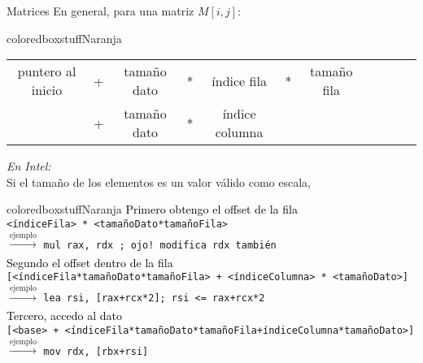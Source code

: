 \documentclass[aspectratio=169]{beamer}
\begin{document}
\begin{frame}[fragile]{Matrices} 
    En general, para una matriz $M[i,j]$:\\
    \bigskip
    \begin{beamercolorbox}[wd=1\textwidth,sep=0.5em]{coloredboxstuffNaranja}
    \begin{center}
    \small
    \vspace{-0.5cm}
    \begin{tabular}{clclclclclc}
    puntero al inicio & + & tamaño dato & * & índice fila    & * & tamaño fila\\
                      & + & tamaño dato & * & índice columna &   & \\
    \end{tabular}
    \end{center}
    \vspace{-0.5cm}
    \end{beamercolorbox}
    \vskip 5pt
    \pause
    \textit{En Intel:}\\
    \vskip 3pt
    Si el tamaño de los elementos es un valor válido como escala,
    \vskip 3pt
    \begin{beamercolorbox}[wd=1\textwidth,sep=0.5em]{coloredboxstuffNaranja}
    \small
    \pause
    \textcolor{black}{Primero obtengo el offset de la fila}\\
    \verb|<índiceFila> * <tamañoDato*tamañoFila>|\\
    $\xrightarrow[]{\text{ejemplo}}$ \verb|mul rax, rdx ; ojo! modifica rdx también|\\
    \vskip 5pt
    \pause
    \textcolor{black}{Segundo el offset dentro de la fila}\\
    \verb|[<índiceFila*tamañoDato*tamañoFila> + <índiceColumna> * <tamañoDato>]|\\
    $\xrightarrow[]{\text{ejemplo}}$ \verb|lea rsi, [rax+rcx*2]; rsi <= rax+rcx*2| \\
    \vskip 5pt
    \pause
    \textcolor{black}{Tercero, accedo al dato}\\
    \verb|[<base> + <índiceFila*tamañoDato*tamañoFila+índiceColumna*tamañoDato>]|\\
    $\xrightarrow[]{\text{ejemplo}}$ \verb|mov rdx, [rbx+rsi] |\\
    \end{beamercolorbox}
\end{frame}
\end{document}
